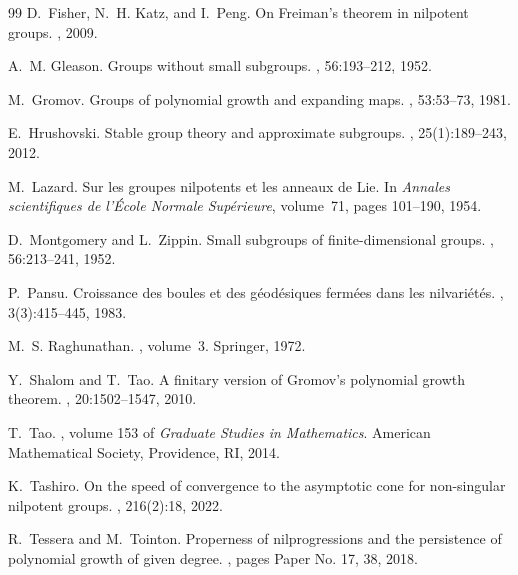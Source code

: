 \documentclass[11pt]{article}
\numberwithin{equation}{section}
\theoremstyle{plain}
\theoremstyle{definition}
\theoremstyle{remark}
\numberwithin{equation}{section}
\numberwithin{equation}{section}
\begin{document}
\begin{thebibliography}{99}
D.~Fisher, N.~H. Katz, and I.~Peng.
\newblock On {F}reiman's theorem in nilpotent groups.
, 2009.

A.~M. Gleason.
\newblock Groups without small subgroups.
, 56:193--212, 1952.

M.~Gromov.
\newblock Groups of polynomial growth and expanding maps.
, 53:53--73, 1981.

E.~Hrushovski.
\newblock Stable group theory and approximate subgroups.
, 25(1):189--243, 2012.

M.~Lazard.
\newblock Sur les groupes nilpotents et les anneaux de {L}ie.
\newblock In {\em Annales scientifiques de l'{\'E}cole Normale Sup{\'e}rieure},
  volume~71, pages 101--190, 1954.

D.~Montgomery and L.~Zippin.
\newblock Small subgroups of finite-dimensional groups.
, 56:213--241, 1952.

P.~Pansu.
\newblock Croissance des boules et des g{\'e}od{\'e}siques ferm{\'e}es dans les
  nilvari{\'e}t{\'e}s.
, 3(3):415--445, 1983.

M.~S. Raghunathan.
, volume~3.
\newblock Springer, 1972.

Y.~Shalom and T.~Tao.
\newblock A finitary version of {G}romov's polynomial growth theorem.
, 20:1502--1547, 2010.

T.~Tao.
, volume 153 of {\em
  Graduate Studies in Mathematics}.
\newblock American Mathematical Society, Providence, RI, 2014.

K.~Tashiro.
\newblock On the speed of convergence to the asymptotic cone for non-singular
  nilpotent groups.
, 216(2):18, 2022.

R.~Tessera and M.~Tointon.
\newblock Properness of nilprogressions and the persistence of polynomial
  growth of given degree.
, pages Paper No. 17, 38, 2018.


\end{thebibliography}
\end{document}
